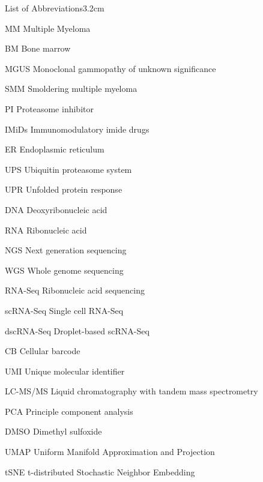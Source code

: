 \begin{mclistof}{List of Abbreviations}{3.2cm}

\item[MM] Multiple Myeloma

\item[BM] Bone marrow

\item[MGUS] Monoclonal gammopathy of unknown significance

\item[SMM] Smoldering multiple myeloma

\item[PI] Proteasome inhibitor

\item[IMiDs] Immunomodulatory imide drugs

\item[ER] Endoplasmic reticulum

\item[UPS] Ubiquitin proteasome system

\item[UPR] Unfolded protein response

\item[DNA] Deoxyribonucleic acid

\item[RNA] Ribonucleic acid

\item[NGS] Next generation sequencing

\item[WGS] Whole genome sequencing

\item[RNA-Seq] Ribonucleic acid sequencing

\item[scRNA-Seq] Single cell RNA-Seq

\item[dscRNA-Seq] Droplet-based scRNA-Seq

\item[CB] Cellular barcode

\item[UMI] Unique molecular identifier

\item[LC-MS/MS] Liquid chromatography with tandem mass spectrometry

\item[PCA] Principle component analysis

\item[DMSO] Dimethyl sulfoxide

\item[UMAP] Uniform Manifold Approximation and Projection

\item[tSNE] t-distributed Stochastic Neighbor Embedding

\end{mclistof} 
